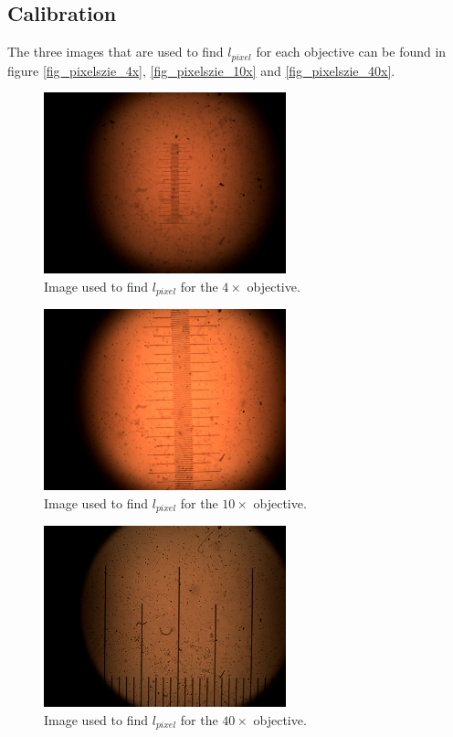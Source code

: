 \subsection{Calibration}
\label{appendix_calibration}

The three images that are used to find $l_{pixel}$ for each objective can be found in figure \ref{fig_pixelszie_4x}, \ref{fig_pixelszie_10x} and \ref{fig_pixelszie_40x}.

\begin{figure}[h!]
    \centering
    \includegraphics[width=7cm]{afbeeldingen/pixelsize/pixelsize_4x.jpg}
    \captionsetup{font=small, justification = centering}
    \caption{Image used to find $l_{pixel}$ for the $4\times$ objective.}
    \label{fig_pixelsize_4x}
\end{figure}

\begin{figure}[h!]
    \centering
    \includegraphics[width=7cm]{afbeeldingen/pixelsize/pixelsize_10x.jpg}
    \captionsetup{font=small, justification = centering}
    \caption{Image used to find $l_{pixel}$ for the $10\times$ objective.}
    \label{fig_pixelsize_10x}
\end{figure}

\begin{figure}[h!]
    \centering
    \includegraphics[width=7cm]{afbeeldingen/pixelsize/pixelsize_40x.jpg}
    \captionsetup{font=small, justification = centering}
    \caption{Image used to find $l_{pixel}$ for the $40\times$ objective.}
    \label{fig_pixelsize_40x}
\end{figure}